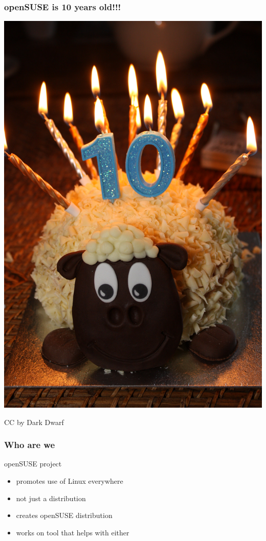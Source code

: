 \documentclass{beamer}
\begin{document}

\begin{frame}[t]
\frametitle{openSUSE is 10 years old!!!}
\begin{center}
\includegraphics[height=.7\paperheight]{birthday}
\end{center}
{\flushright
CC by Dark Dwarf
}
\end{frame}

\begin{frame}[t]
\frametitle{Who are we}
openSUSE project
\begin{itemize}
\item promotes use of Linux everywhere
\item not just a distribution
\item creates openSUSE distribution
\item works on tool that helps with either
\end{itemize}
\end{frame}
\end{document}
